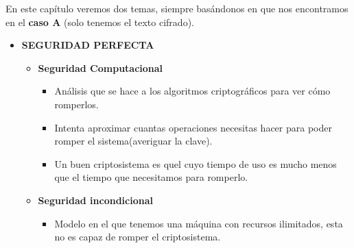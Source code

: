  En este capítulo veremos dos temas, siempre basándonos en que nos encontramos en el \textbf{caso A} (solo tenemos el texto cifrado).
 
 \begin{itemize}
 	\item \textbf{SEGURIDAD PERFECTA}
 	\begin{itemize}
 		\item \textbf{Seguridad Computacional}
 		\begin{itemize}
 			\item Análisis que se hace a los algoritmos criptográficos para ver cómo romperlos.
 			\item  Intenta aproximar cuantas operaciones necesitas hacer para poder romper el sistema(averiguar la clave).
 			\item Un buen criptosistema es quel cuyo tiempo de uso es mucho menos que el tiempo que necesitamos para romperlo.
 			
 		\end{itemize} 

 		\item \textbf{Seguridad incondicional}
 		\begin{itemize}
 			\item Modelo en el que tenemos una máquina con recursos ilimitados, esta no es capaz de romper el criptosistema.
 		\end{itemize}
 	\end{itemize}
 	
 \end{itemize}


